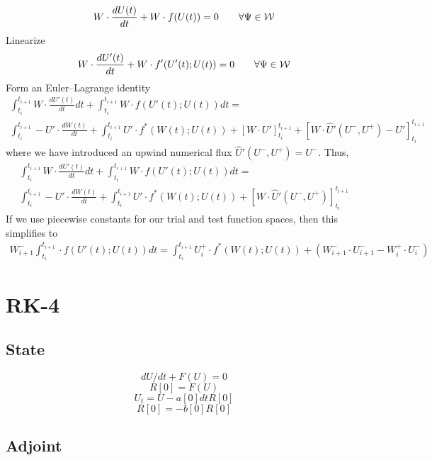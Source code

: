 \documentclass[10pt]{article}
\begin{document}
\begin{equation}
W \cdot \frac{dU(t)}{dt} + W \cdot f(U(t)) = 0 \qquad 
\forall \Psi\in{\cal W}
\end{equation}
Linearize
\begin{equation}
W \cdot \frac{dU'(t)}{dt} + W \cdot f'( U'(t) ; U(t) ) = 0 
\qquad \forall \Psi\in{\cal W}
\end{equation}
Form an Euler--Lagrange identity
\begin{eqnarray}
\int_{t_i}^{t_{i+1}} W \cdot \frac{dU'(t)}{dt} dt + 
\int_{t_i}^{t_{i+1}} W \cdot f(U'(t);U(t)) dt = \nonumber\\
\int_{t_i}^{t_{i+1}} -U' \cdot \frac{dW(t)}{dt} + 
\int_{t_i}^{t_{i+1}} U' \cdot f^*(W(t);U(t)) +
\left[ W \cdot U' \right]_{t_i}^{t_{i+1}} + 
\left[ W \cdot \widehat U'(U^-,U^+) - U' \right]_{t_i}^{t_{i+1}}
\end{eqnarray}
where we have introduced an upwind numerical flux $\widehat U'(U^-,U^+) =
U^-$.  Thus,
\begin{eqnarray}
\int_{t_i}^{t_{i+1}} W \cdot \frac{dU'(t)}{dt} dt + 
\int_{t_i}^{t_{i+1}} W \cdot f(U'(t);U(t)) dt = \nonumber\\
\int_{t_i}^{t_{i+1}} -U' \cdot \frac{dW(t)}{dt} + 
\int_{t_i}^{t_{i+1}} U' \cdot f^*(W(t);U(t)) +
\left[ W \cdot \widehat U'(U^-,U^+)\right]_{t_i}^{t_{i+1}}
\end{eqnarray}
If we use piecewise constants for our trial and test function spaces, then
this simplifies to
\begin{eqnarray}
W_{i+1}^- \int_{t_i}^{t_{i+1}} \cdot f(U'(t);U(t)) dt = 
\int_{t_i}^{t_{i+1}} U_{i}^+ \cdot f^*(W(t);U(t)) +
( W_{i+1}^- \cdot U_{i+1}^- - W_{i}^+ \cdot U_{i}^- )
\end{eqnarray}

%
\section*{RK-4}

\subsection*{State}

\[ dU/dt + F(U) = 0 \]
\[ R[0] = F(U) \]
\[ U_t = U - a[0] dt R[0] \]
\[ R[0] = -b[0] R[0] \]

\subsection*{Adjoint}

%
\end{document}
